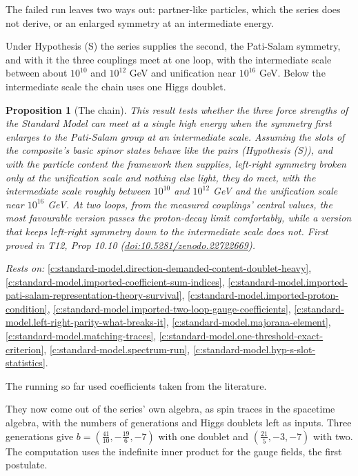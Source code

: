 \documentclass[11pt]{article}
\newtheorem{proposition}[theorem]{Proposition}
\theoremstyle{definition}
\theoremstyle{plain}
\begin{document}
The failed run leaves two ways out: partner-like particles, which the series does not derive, or an enlarged symmetry at an intermediate energy.

Under Hypothesis (S) the series supplies the second, the Pati-Salam symmetry, and with it the three couplings meet at one loop, with the intermediate scale between about $10^{10}$ and $10^{12}$ GeV and unification near $10^{16}$ GeV. Below the intermediate scale the chain uses one Higgs doublet.

\begin{proposition}[The chain]\label{c:standard-model.chain}
This result tests whether the three force strengths of the Standard Model can meet at a single high energy when the symmetry first enlarges to the Pati-Salam group at an intermediate scale. Assuming the slots of the composite's basic spinor states behave like the pairs (Hypothesis (S)), and with the particle content the framework then supplies, left-right symmetry broken only at the unification scale and nothing else light, they do meet, with the intermediate scale roughly between $10^{10}$ and $10^{12}$ GeV and the unification scale near $10^{16}$ GeV. At two loops, from the measured couplings' central values, the most favourable version passes the proton-decay limit comfortably, while a version that keeps left-right symmetry down to the intermediate scale does not.
\emph{First proved in} T12, Prop 10.10 (\href{https://doi.org/10.5281/zenodo.22722669}{doi:10.5281/zenodo.22722669}).
\end{proposition}
\noindent\emph{Rests on:} \ref{c:standard-model.direction-demanded-content-doublet-heavy}, \ref{c:standard-model.imported-coefficient-sum-indices}, \ref{c:standard-model.imported-pati-salam-representation-theory-survival}, \ref{c:standard-model.imported-proton-condition}, \ref{c:standard-model.imported-two-loop-gauge-coefficients}, \ref{c:standard-model.left-right-parity-what-breaks-it}, \ref{c:standard-model.majorana-element}, \ref{c:standard-model.matching-traces}, \ref{c:standard-model.one-threshold-exact-criterion}, \ref{c:standard-model.spectrum-run}, \ref{c:standard-model.hyp-s-slot-statistics}.

The running so far used coefficients taken from the literature.

They now come out of the series' own algebra, as spin traces in the spacetime algebra, with the numbers of generations and Higgs doublets left as inputs. Three generations give $b = (\tfrac{41}{10}, -\tfrac{19}{6}, -7)$ with one doublet and $(\tfrac{21}{5}, -3, -7)$ with two. The computation uses the indefinite inner product for the gauge fields, the first postulate.
\end{document}
